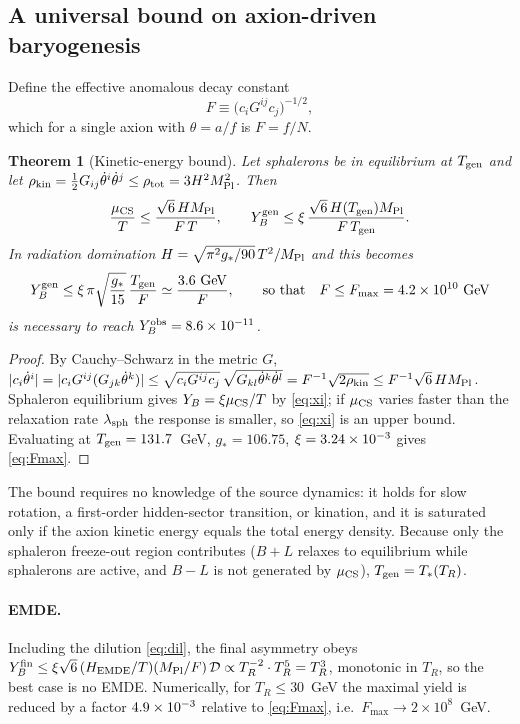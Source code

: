 \documentclass[11pt]{article}
\newtheorem{theorem}{Theorem}
\newcommand{\MP}{M_{\rm Pl}}
\newcommand{\Tgen}{T_{\rm gen}}
\newcommand{\Yobs}{Y_B^{\rm obs}}
\begin{document}
\subsection{A universal bound on axion-driven baryogenesis}
Define the effective anomalous decay constant
\begin{equation}
F\equiv\big(c_iG^{ij}c_j\big)^{-1/2},\label{eq:F}
\end{equation}
which for a single axion with $\theta=a/f$ is $F=f/N$.
\begin{theorem}[Kinetic-energy bound]\label{thm:axion}
Let sphalerons be in equilibrium at $T_{\rm gen}$ and let $\rho_{\rm kin}=\tfrac12G_{ij}\dot\theta^i\dot\theta^j\le\rho_{\rm tot}=3H^2\MP^2$. Then
\begin{equation}
\frac{\mu_{\rm CS}}{T}\le\frac{\sqrt6\,H\MP}{F\,T},\qquad Y_B^{\rm gen}\le\xi\,\frac{\sqrt6\,H(\Tgen)\MP}{F\,\Tgen}.\label{eq:kin}
\end{equation}
In radiation domination $H=\sqrt{\pi^2g_*/90}\,T^2/\MP$ and this becomes
\begin{equation}
Y_B^{\rm gen}\le\xi\,\pi\sqrt{\frac{g_*}{15}}\,\frac{\Tgen}{F}\simeq\frac{3.6~\text{GeV}}{F},\qquad\text{so that}\quad F\le F_{\max}=\fNmax~\text{GeV}\label{eq:Fmax}
\end{equation}
is necessary to reach $\Yobs=8.6\times10^{-11}$.
\end{theorem}
\begin{proof}
By Cauchy--Schwarz in the metric $G$, $|c_i\dot\theta^i|=|c_iG^{ij}(G_{jk}\dot\theta^k)|\le\sqrt{c_iG^{ij}c_j}\,\sqrt{G_{kl}\dot\theta^k\dot\theta^l}=F^{-1}\sqrt{2\rho_{\rm kin}}\le F^{-1}\sqrt{6}\,H\MP$. Sphaleron equilibrium gives $Y_B=\xi\mu_{\rm CS}/T$ by \eqref{eq:xi}; if $\mu_{\rm CS}$ varies faster than the relaxation rate $\lambda_{\rm sph}$ the response is smaller, so \eqref{eq:xi} is an upper bound. Evaluating at $T_{\rm gen}=131.7$~GeV, $g_*=106.75$, $\xi=3.24\times10^{-3}$ gives \eqref{eq:Fmax}.
\end{proof}
The bound requires no knowledge of the source dynamics: it holds for slow rotation, a first-order hidden-sector transition, or kination, and it is saturated only if the axion kinetic energy equals the total energy density. Because only the sphaleron freeze-out region contributes ($B+L$ relaxes to equilibrium while sphalerons are active, and $B-L$ is not generated by $\mu_{\rm CS}$), $T_{\rm gen}=T_*(T_R)$.

\paragraph{EMDE.} Including the dilution \eqref{eq:dil}, the final asymmetry obeys $Y_B^{\rm fin}\le\xi\sqrt6\,(H_{\rm EMDE}/T)(\MP/F)\,\mathcal D\propto T_R^{-2}\cdot T_R^5=T_R^3$, monotonic in $T_R$, so the best case is no EMDE. Numerically, for $T_R\le30$~GeV the maximal yield is reduced by a factor $4.9\times10^{-3}$ relative to \eqref{eq:Fmax}, i.e.\ $F_{\max}\to2\times10^{8}$~GeV.
\end{document}
